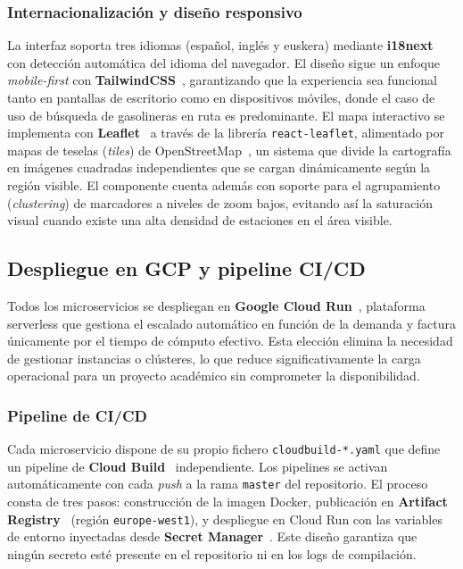 \subsubsection*{Internacionalización y diseño responsivo}

La interfaz soporta tres idiomas (español, inglés y euskera) mediante
\textbf{i18next}~\cite{i18next} con detección automática del idioma del navegador. El
diseño sigue un enfoque \textit{mobile-first} con \textbf{TailwindCSS}~\cite{tailwind},
garantizando que la experiencia sea funcional tanto en pantallas de escritorio como en
dispositivos móviles, donde el caso de uso de búsqueda de gasolineras en ruta es
predominante. El mapa interactivo se implementa con \textbf{Leaflet}~\cite{leaflet} a través
de la librería \texttt{react-leaflet}, alimentado por mapas de teselas (\textit{tiles}) de
OpenStreetMap~\cite{openstreetmap}, un sistema que divide la cartografía en imágenes cuadradas
independientes que se cargan dinámicamente según la región visible. El componente cuenta además
con soporte para el agrupamiento (\textit{clustering}) de marcadores a niveles de zoom bajos,
evitando así la saturación visual cuando existe una alta densidad de estaciones en el área
visible.

\subsection{Despliegue en GCP y pipeline CI/CD}
\label{subsec:despliegue_impl}

Todos los microservicios se despliegan en \textbf{Google Cloud Run}~\cite{cloud_run2026},
plataforma serverless que gestiona el escalado automático en función de la demanda y
factura únicamente por el tiempo de cómputo efectivo. Esta elección elimina la necesidad
de gestionar instancias o clústeres, lo que reduce significativamente la carga operacional
para un proyecto académico sin comprometer la disponibilidad.

\subsubsection*{Pipeline de CI/CD}

Cada microservicio dispone de su propio fichero \texttt{cloudbuild-*.yaml} que define un
pipeline de \textbf{Cloud Build}~\cite{cloud_build2026} independiente. Los pipelines se
activan automáticamente con cada \textit{push} a la rama \texttt{master} del repositorio.
El proceso consta de tres pasos: construcción de la imagen Docker, publicación en
\textbf{Artifact Registry}~\cite{artifact_registry} (región \texttt{europe-west1}), y
despliegue en Cloud Run con las variables de entorno inyectadas desde
\textbf{Secret Manager}~\cite{secret_manager}. Este diseño garantiza que ningún secreto
esté presente en el repositorio ni en los logs de compilación.

